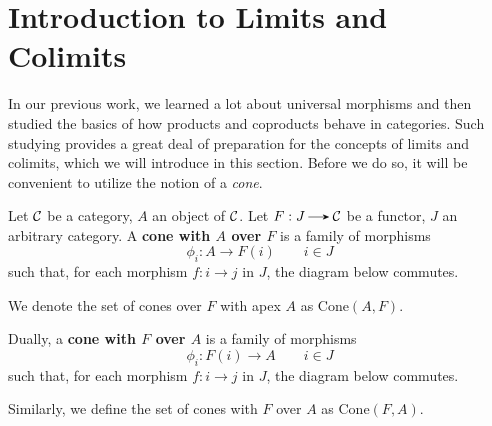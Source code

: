     \newpage
    \section{Introduction to Limits and Colimits}
    In our previous work, we learned a lot about universal morphisms and 
    then studied the basics of how products and coproducts behave in categories. 
    Such studying provides a great deal of preparation for the concepts of limits 
    and colimits, which we will introduce in this section.
    Before we do so, it will be convenient to utilize the notion of a \emph{cone}. 

    \begin{definition}
        Let $\mathcal{C}$ be a category, $A$ an object of $\mathcal{C}$. Let $F: J \to \cc$ be a functor, 
        $J$ an arbitrary category. A \textbf{cone with $A$ over $F$} is a family 
        of morphisms 
        \[
            \phi_i: A \to F(i) \qquad i \in J
        \]
        such that, for each morphism $f: i \to j$ in $J$, the diagram 
        below commutes. 
        \begin{center}
        \end{center}
        We denote the set of cones over $F$ with apex $A$ as $\text{Cone}(A, F)$.

        Dually, a \textbf{cone with $F$ over $A$} is a family of morphisms 
        \[
            \phi_i: F(i) \to A \qquad i \in J
        \]
        such that, for each morphism $f: i \to j$ in $J$, the diagram below commutes. 
        \begin{center}
        \end{center}
        Similarly, we define the set of cones with $F$ over $A$ as $\text{Cone}(F, A)$. 
    \end{definition}

